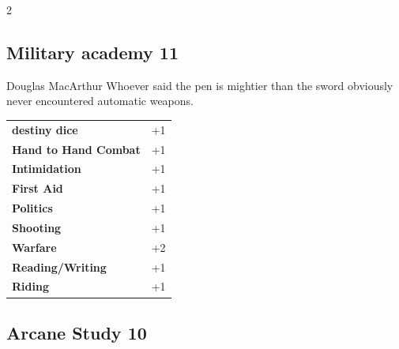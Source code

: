 \begin{multicols}{2}
\begin{tcolorbox}

\end{tcolorbox}

\begin{tcolorbox}
    \subsection*{Military academy \hfill \small{11 }}
    \tcblower


\begin{pquote}{Douglas MacArthur}
Whoever said the pen is mightier than the sword obviously never encountered automatic weapons.
\end{pquote}

\vspace{3mm}

\begin{tabular}{@{}ll@{}}
    \textbf{destiny dice} & +1\\
    \textbf{Hand to Hand Combat} & +1\\
    \textbf{Intimidation} & +1\\
    \textbf{First Aid} & +1\\
    \textbf{Politics} & +1\\
    \textbf{Shooting} & +1\\
    \textbf{Warfare} & +2\\
    \textbf{Reading/Writing} & +1\\
    \textbf{Riding} & +1\\
\end{tabular}


\end{tcolorbox}

\begin{tcolorbox}
    \subsection*{Arcane Study \hfill \small{10 }}
    \tcblower





\end{tcolorbox}
\end{multicols}
